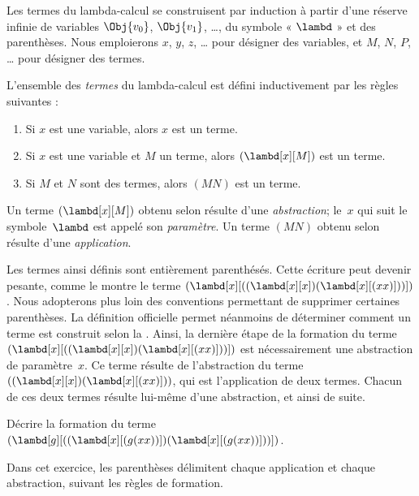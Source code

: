 \documentclass[../../../include/open-logic-section]{subfiles}
\begin{document}

Les termes du lambda-calcul se construisent
par induction à partir d'une réserve infinie
de variables $\Obj{v_0}$, $\Obj{v_1}$, \dots,
du symbole « $\lambd$ » et des parenthèses.
Nous emploierons $x$, $y$, $z$, \dots{} pour
désigner des variables, et $M$, $N$, $P$,
\dots{} pour désigner des termes.

\begin{defn}[Termes] 
L'ensemble des \emph{termes} du lambda-calcul
est défini inductivement par les règles suivantes :
\begin{enumerate}
  \item {} Si $x$ est une
    variable, alors $x$ est un terme.
  \item {} Si $x$ est une
    variable et $M$ un terme, alors
    $(\lambd[x][M])$ est un terme.
  \item {} Si $M$ et $N$
    sont des termes, alors $(MN)$ est un terme.
\end{enumerate}
\end{defn}

Un terme $(\lambd[x][M])$ obtenu selon
 résulte d'une
\emph{abstraction}; le~$x$ qui suit le
symbole~$\lambd$ est appelé son
\emph{paramètre}. Un terme $(MN)$ obtenu
selon  résulte d'une
\emph{application}.

Les termes ainsi définis sont entièrement
parenthésés. Cette écriture peut devenir
pesante, comme le montre le terme
$(\lambd[x][((\lambd[x][x])(\lambd[x][(xx)]))])$.
Nous adopterons plus loin des conventions
permettant de supprimer certaines parenthèses.
La définition officielle permet néanmoins
de déterminer comment un terme est construit
selon la . Ainsi, la dernière
étape de la formation du terme
$(\lambd[x][((\lambd[x][x])(\lambd[x][(xx)]))])$
est nécessairement une abstraction de
paramètre~$x$. Ce terme résulte de l'abstraction
du terme $((\lambd[x][x])(\lambd[x][(xx)]))$,
qui est l'application de deux termes. Chacun
de ces deux termes résulte lui-même d'une
abstraction, et ainsi de suite.

\begin{prob}
Décrire la formation du terme
$(\lambd[g][((\lambd[x][(g (x x))])
  (\lambd[x][(g (x x))]))])$.
\end{prob}
\begin{explain}
Dans cet exercice, les parenthèses délimitent chaque application
et chaque abstraction, suivant les règles de formation.
\end{explain}
\end{document}
